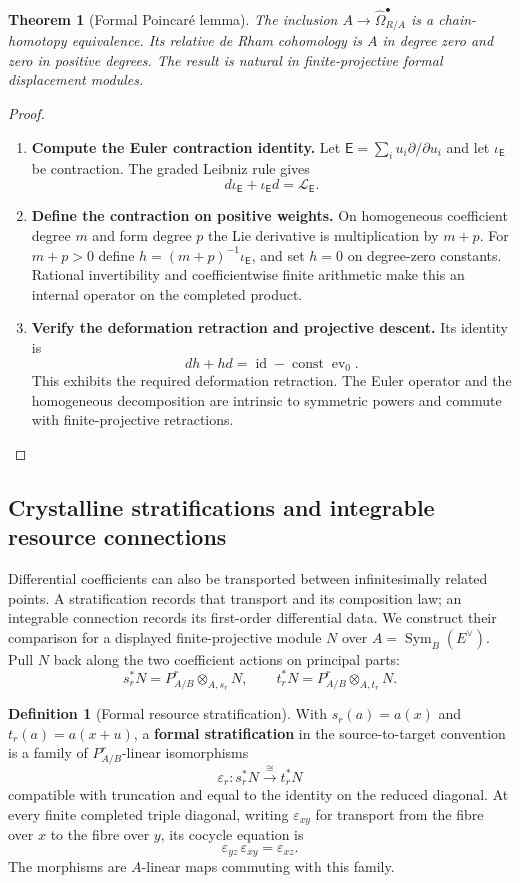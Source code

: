 \documentclass[11pt,a4paper]{article}
\numberwithin{algorithm}{section}
\numberwithin{equation}{section}
\newtheorem{theorem}{Theorem}[section]
\theoremstyle{definition}
\newtheorem{definition}[definition]{Definition}
\theoremstyle{remark}
\theoremstyle{plain}
\newcommand{\id}{\operatorname{id}}
\newcommand{\Sym}{\operatorname{Sym}}
\theoremstyle{definition}
\theoremstyle{plain}
\begin{document}
\begin{theorem}[Formal Poincar\'e lemma]
\label{thm:formal-poincare}
The inclusion $A\to\widehat\Omega^\bullet_{R/A}$ is a chain-homotopy
equivalence.  Its relative de Rham cohomology is $A$ in degree
zero and zero in positive degrees.  The result is natural in
finite-projective formal displacement modules.
\end{theorem}
\begin{proof}\leavevmode
\begin{enumerate}[leftmargin=*,align=left]
\item \textbf{Compute the Euler contraction identity.}
Let $\mathsf E=\sum_i u_i\partial/\partial u_i$ and let
$\iota_{\mathsf E}$ be contraction.  The graded Leibniz rule
gives
\[
 d\iota_{\mathsf E}+\iota_{\mathsf E}d
  =\mathcal L_{\mathsf E}.
\]

\item \textbf{Define the contraction on positive weights.}
On homogeneous coefficient degree $m$ and form degree $p$ the
Lie derivative is multiplication by $m+p$.  For $m+p>0$ define
$h=(m+p)^{-1}\iota_{\mathsf E}$, and set $h=0$ on degree-zero
constants.  Rational invertibility and coefficientwise
finite arithmetic make this an internal operator on the
completed product.

\item \textbf{Verify the deformation retraction and projective descent.}
Its identity is
\[
 dh+hd=\id-\operatorname{const}\operatorname{ev}_0.
\]
This exhibits the required deformation retraction.  The Euler
operator and the homogeneous decomposition are intrinsic to
symmetric powers and commute with finite-projective retractions.
\end{enumerate}
\end{proof}

\subsection{Crystalline stratifications and integrable resource connections}
\label{sec:crystals}
Differential coefficients can also be transported between
infinitesimally related points. A stratification records that
transport and its composition law; an integrable connection
records its first-order differential data. We construct their
comparison for a displayed finite-projective module $N$ over
$A=\Sym_B(E^\vee)$. Pull $N$ back along the two coefficient
actions on principal parts:
\[
 s_r^*N=P^r_{A/B}\otimes_{A,s_r}N,
 \qquad
 t_r^*N=P^r_{A/B}\otimes_{A,t_r}N.
\]
\begin{definition}[Formal resource stratification]
\label{def:formal-stratification}
With $s_r(a)=a(x)$ and $t_r(a)=a(x+u)$, a \textbf{formal stratification} in the source-to-target convention is a family
of $P^r_{A/B}$-linear isomorphisms
\[
 \varepsilon_r:s_r^*N\xrightarrow{\ \cong\ }t_r^*N
\]
compatible with truncation and equal to the identity on the
reduced diagonal.  At every finite completed triple diagonal,
writing $\varepsilon_{xy}$ for transport from the fibre over
$x$ to the fibre over $y$, its cocycle equation is
\[
 \varepsilon_{yz}\,\varepsilon_{xy}=\varepsilon_{xz}.
\]
The morphisms are $A$-linear maps commuting with this family.
\end{definition}
\end{document}
